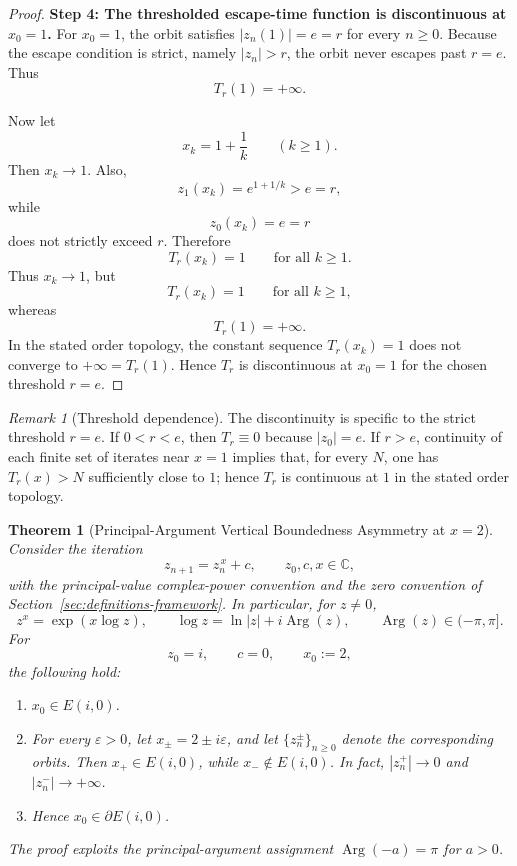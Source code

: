 \documentclass[12pt,a4paper]{amsart}
\newtheorem{theorem}{Theorem}[section]
\theoremstyle{remark}
\newtheorem{remark}{Remark}[section]
\newcommand{\C}{\mathbb{C}}
\begin{document}
\begin{proof}
\smallskip
\noindent\textbf{Step 4: The thresholded escape-time function is discontinuous at $x_0=1$.}
For $x_0=1$, the orbit satisfies $|z_n(1)|=e=r$ for every $n\ge0$.
Because the escape condition is strict, namely $|z_n|>r$, the orbit never
escapes past $r=e$. Thus
\[
T_r(1)=+\infty.
\]

Now let
\[
x_k=1+\frac{1}{k}
\qquad(k\ge1).
\]
Then $x_k\to1$. Also,
\[
z_1(x_k)=e^{1+1/k}>e=r,
\]
while
\[
z_0(x_k)=e=r
\]
does not strictly exceed $r$. Therefore
\[
T_r(x_k)=1
\qquad\text{for all } k\ge1.
\]
Thus $x_k\to1$, but
\[
T_r(x_k)=1
\qquad\text{for all } k\ge1,
\]
whereas
\[
T_r(1)=+\infty.
\]
In the stated order topology, the constant sequence $T_r(x_k)=1$ does not
converge to $+\infty=T_r(1)$. Hence $T_r$ is discontinuous at $x_0=1$ for
the chosen threshold $r=e$.
\end{proof}

\begin{remark}[Threshold dependence]
The discontinuity is specific to the strict threshold $r=e$. If $0<r<e$, then
$T_r\equiv0$ because $|z_0|=e$. If $r>e$, continuity of each finite set of
iterates near $x=1$ implies that, for every $N$, one has $T_r(x)>N$ sufficiently
close to $1$; hence $T_r$ is continuous at $1$ in the stated order topology.
\end{remark}



\smallskip

\begin{theorem}[Principal-Argument Vertical Boundedness Asymmetry at $x=2$]
\label{thm:principal-argument-vertical-asymmetry}
Consider the iteration
\[
z_{n+1}=z_n^{\,x}+c,\qquad z_0,c,x\in\C,
\]
with the principal-value complex-power convention and the zero convention of
Section~\ref{sec:definitions-framework}. In particular, for $z\ne0$,
\[
z^x=\exp(x\log z),\qquad
\log z=\ln|z|+i\operatorname{Arg}(z),\qquad \operatorname{Arg}(z)\in(-\pi,\pi].
\]
For
\[
z_0=i,\qquad c=0,\qquad x_0:=2,
\]
the following hold:
\begin{enumerate}
  \item $x_0\in E(i,0)$.
  \item For every $\varepsilon>0$, let
        $x_\pm=2\pm i\varepsilon$, and let
        $\{z_n^\pm\}_{n\ge0}$ denote the corresponding orbits. Then
        $x_+\in E(i,0)$, while $x_-\notin E(i,0)$. In fact,
        $|z_n^+|\to0$ and $|z_n^-|\to+\infty$.
  \item Hence $x_0\in\partial E(i,0)$.
\end{enumerate}
The proof exploits the principal-argument assignment $\operatorname{Arg}(-a)=\pi$ for $a>0$.
\end{theorem}
\end{document}
